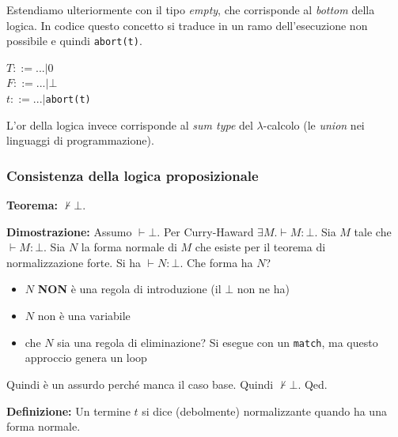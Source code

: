\documentclass{article}
\begin{document}
\bigskip

Estendiamo ulteriormente con il tipo \textit{empty}, che corrisponde al \textit{bottom} della logica. In codice questo concetto si traduce in un ramo dell'esecuzione non possibile e quindi \verb|abort(t)|.

\bigskip

\noindent $T ::= ... |0$ \\
$F ::= ... | \bot$ \\
$t::= ...|$\verb|abort(t)|

\bigskip

\begin{minipage}{0.49\textwidth}
\end{minipage}
{
\hspace{2em}
\begin{minipage}{0.49\textwidth}
\end{minipage}}

\bigskip

L'or della logica invece corrisponde al \textit{sum type} del $\lambda$-calcolo (le \textit{union} nei linguaggi di programmazione).

\subsubsection{Consistenza della logica proposizionale}
\textbf{Teorema:} $\not \vdash\bot$.

\textbf{Dimostrazione:} Assumo $\vdash \bot$. Per Curry-Haward $\exists M. \vdash M: \bot$. Sia $M$ tale che $\vdash M : \bot$. Sia $N$ la forma normale di $M$ che esiste per il teorema di normalizzazione forte. Si ha $\vdash N : \bot$. Che forma ha $N$?
\begin{itemize}
    \item $N$ \textbf{NON} è una regola di introduzione (il $\bot$ non ne ha)
    \item $N$ non è una variabile
    \item che $N$ sia una regola di eliminazione? Si esegue con un \verb|match|, ma questo approccio genera un loop
\end{itemize}
Quindi è un assurdo perché manca il caso base. Quindi $\not\vdash \bot$. Qed.

\bigskip

\noindent \textbf{Definizione:} Un termine $t$ si dice (debolmente) normalizzante quando ha una forma normale.
\end{document}
